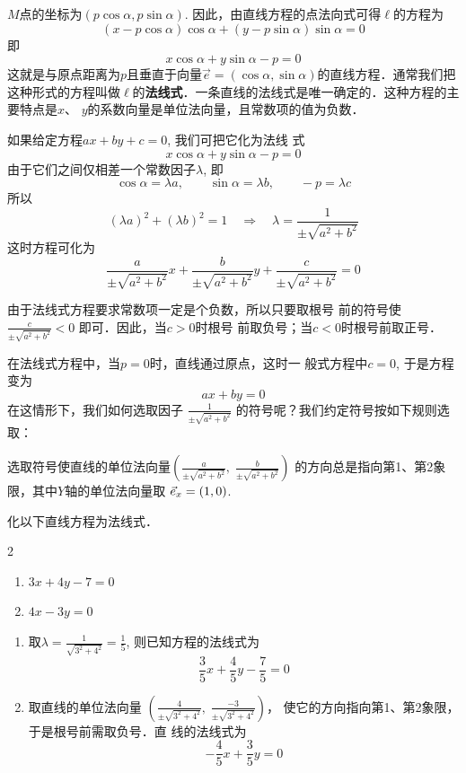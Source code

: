 $M$点的坐标为$(p\cos\alpha, p\sin\alpha)$. 
因此，由直线方程的点法向式可得$\ell$的方程为
\[(x-p\cos\alpha)\cos\alpha+(y-p\sin\alpha)\sin\alpha=0\]
即
\[x\cos\alpha+y\sin\alpha-p=0\]
这就是与原点距离为$p$且垂直于向量$\vec{e}=(\cos\alpha,\sin\alpha)$的直线方程．通常我们把这种形式的方程叫做$\ell$的\textbf{法线式}．一条直线的法线式是唯一确定的．这种方程的主要特点是$x$、
$y$的系数向量是单位法向量，且常数项的值为负数．

如果给定方程$ax+by+c=0$, 我们可把它化为法线
式
\[x\cos\alpha+y\sin\alpha-p=0\]
由于它们之间仅相差一个常数因子$\lambda$, 即
\[\cos\alpha=\lambda a,\qquad \sin\alpha=\lambda b,\qquad -p=\lambda c\]
所以
\[(\lambda a)^2+(\lambda b)^2=1 \quad \Rightarrow\quad 
\lambda=\frac{1}{\pm\sqrt{a^2+b^2}}\]
这时方程可化为
\[\frac{a}{\pm\sqrt{a^2+b^2}}x+\frac{b}{\pm\sqrt{a^2+b^2}}y+\frac{c}{\pm\sqrt{a^2+b^2}}=0\]

由于法线式方程要求常数项一定是个负数，所以只要取根号
前的符号使$\frac{c}{\pm\sqrt{a^2+b^2}}<0$
即可．因此，当$c>0$时根号
前取负号；当$c<0$时根号前取正号．

在法线式方程中，当$p=0$时，直线通过原点，这时一
般式方程中$c=0$, 于是方程变为
\[ax+by=0\]
在这情形下，我们如何选取因子
$\frac{1}{\pm\sqrt{a^2+b^2}}$
的符号呢？我们约定符号按如下规则选取：

选取符号使直线的单位法向量$\left(\frac{a}{\pm\sqrt{a^2+b^2}},\; \frac{b}{\pm\sqrt{a^2+b^2}}\right)$
的方向总是指向第1、第2象限，其中$Y$轴的单位法向量取
$\vec{e}_x=(1,0)$.


\begin{example}
    化以下直线方程为法线式．
\begin{multicols}{2}
\begin{enumerate}
    \item $3x+4y-7=0$
    \item $4x-3y=0$
\end{enumerate} 
\end{multicols}
\end{example}


\begin{solution}
\begin{enumerate}
    \item 取$\lambda=\frac{1}{\sqrt{3^2+4^2}}=\frac{1}{5}$, 
    则已知方程的法线式为
    \[\frac{3}{5}x+\frac{4}{5}y-\frac{7}{5}=0\]
\item 取直线的单位法向量
$\left(\frac{4}{\pm\sqrt{3^2+4^2}},\; \frac{-3}{\pm\sqrt{3^2+4^2}}\right)$，
    使它的方向指向第1、第2象限，于是根号前需取负号．直
    线的法线式为
\[-\frac{4}{5}x+\frac{3}{5}y=0\] 
\end{enumerate}
\end{solution}

